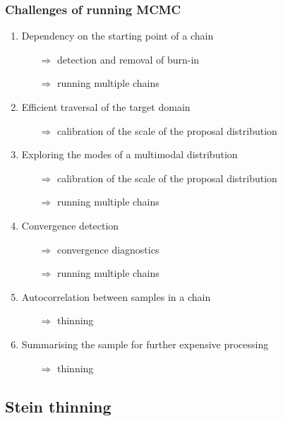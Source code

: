 \documentclass{beamer}
\begin{document}
\begin{frame}
\frametitle{Challenges of running MCMC}

\begin{enumerate}
\item Dependency on the starting point of a chain
    \begin{itemize}
        \item[$\Rightarrow$] detection and removal of burn-in
        \item[$\Rightarrow$] running multiple chains
    \end{itemize}
\item Efficient traversal of the target domain
    \begin{itemize}
        \item[$\Rightarrow$] calibration of the scale of the proposal distribution
    \end{itemize}
\item Exploring the modes of a multimodal distribution
    \begin{itemize}
        \item[$\Rightarrow$] calibration of the scale of the proposal distribution
        \item[$\Rightarrow$] running multiple chains
    \end{itemize}
\item Convergence detection
    \begin{itemize}
        \item[$\Rightarrow$] convergence diagnostics
        \item[$\Rightarrow$] running multiple chains
    \end{itemize}
\item Autocorrelation between samples in a chain
    \begin{itemize}
        \item[$\Rightarrow$] thinning
    \end{itemize}
\item Summarising the sample for further expensive processing
    \begin{itemize}
        \item[$\Rightarrow$] thinning
    \end{itemize}
\end{enumerate}

\end{frame}



\subsection{Stein thinning}
\end{document}
